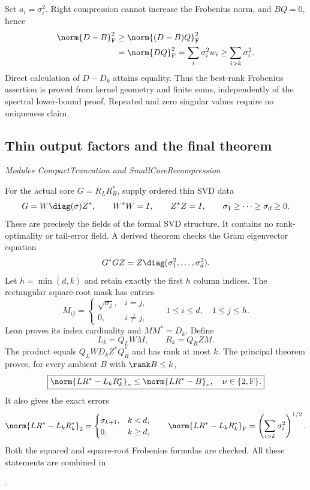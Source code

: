 Set $a_i=\sigma_i^2$. Right compression cannot increase the Frobenius norm, and $BQ=0$, hence
\[
\begin{aligned}
\norm{D-B}_{\mathrm F}^{2}
&\geq\norm{(D-B)Q}_{\mathrm F}^{2}\\
&=\norm{DQ}_{\mathrm F}^{2}
=\sum_i\sigma_i^2w_i
\geq\sum_{i>k}\sigma_i^2.
\end{aligned}
\]
Direct calculation of $D-D_k$ attains equality. Thus the best-rank Frobenius assertion is proved from kernel geometry and finite sums, independently of the spectral lower-bound proof. Repeated and zero singular values require no uniqueness claim.



\subsection{Thin output factors and the final theorem}\label{supp6:subsection:005}\textit{Modules CompactTruncation and SmallCoreRecompression}\par
For the actual core $G=R_LR_R^*$, supply ordered thin SVD data
\[
G=W\diag(\sigma)Z^*,\qquad W^*W=I,
\qquad Z^*Z=I,\qquad \sigma_1\geq\cdots\geq\sigma_d\geq0.
\]
These are precisely the fields of the formal SVD structure. It contains no rank-optimality or tail-error field. A derived theorem checks the Gram eigenvector equation
\[
G^*GZ=Z\diag(\sigma_1^2,\ldots,\sigma_d^2).
\]
Let $h=\min(d,k)$ and retain exactly the first $h$ column indices. The rectangular square-root mask has entries
\[
M_{ij}=\begin{cases}\sqrt{\sigma_j},&i=j,\\0,&i\ne j,\end{cases}
\qquad 1\leq i\leq d,\quad 1\leq j\leq h.
\]
Lean proves its index cardinality and $MM^*=D_k$. Define
\[
\boxed{L_k=Q_LWM,\qquad R_k=Q_RZM.}
\]
The product equals $Q_LWD_kZ^*Q_R^*$ and has rank at most $k$. The principal theorem proves, for every ambient $B$ with $\rank B\leq k$,
\[
\boxed{\norm{LR^*-L_kR_k^*}_\nu\leq\norm{LR^*-B}_\nu,
\quad\nu\in\{2,\mathrm F\}.}
\]
It also gives the exact errors
\[
\norm{LR^*-L_kR_k^*}_2=
\begin{cases}\sigma_{k+1},&k<d,\\0,&k\geq d,\end{cases}
\qquad
\norm{LR^*-L_kR_k^*}_{\mathrm F}
=\left(\sum_{i>k}\sigma_i^2\right)^{1/2}.
\]
Both the squared and square-root Frobenius formulas are checked. All these statements are combined in\par
{}.

